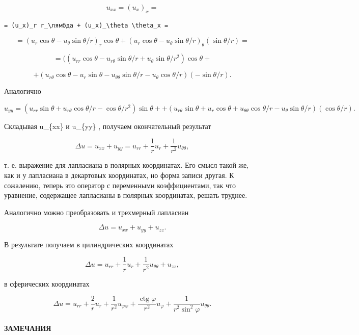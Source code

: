 \documentclass[
  ukrainian,
]{article}
\begin{document}
\[
u_{xx} = (u_x)_x =
\]

\begin{verbatim}
= (u_x)_r r_\лямбда + (u_x)_\theta \theta_x =
\end{verbatim}

\[
= (u_r \cos \theta - u_\theta \sin \theta/r)_r \cos \theta + (u_r \cos \theta - u_\theta \sin \theta/r)_\theta (\sin \theta/r) =
\]

\[
= ((u_{rr} \cos \theta - u_{r\theta} \sin \theta/r + u_\theta \sin \theta/r^2) \cos \theta +
\]

\[
+ (u_{r\theta} \cos \theta - u_r \sin \theta - u_{\theta\theta} \sin \theta/r - u_\theta \cos \theta/r) (-\sin \theta/r).
\]

Аналогично

\[
u_{yy} = (u_{rr}\sin\theta + u_{r\theta}\cos\theta/r - \cos\theta/r^2)\sin\theta + + (u_{r\theta}\sin\theta + u_{r}\cos\theta + u_{\theta\theta}\cos\theta/r - u_{\theta}\sin\theta/r)(\cos\theta/r).
\]

Складывая u\_\{xx\} и u\_\{yy\} , получаем окончательный результат

\[
\Delta u = u_{xx} + u_{yy} = u_{rr} + \frac{1}{r} u_r + \frac{1}{r^2} u_{\theta\theta},
\]

т. е. выражение для лапласиана в полярных координатах. Его смысл такой
же, как и у лапласиана в декартовых координатах, но форма записи другая.
К сожалению, теперь это оператор с переменными коэффициентами, так что
уравнение, содержащее лапласианы в полярных координатах, решать труднее.

Аналогично можно преобразовать и трехмерный лапласиан

\[
\Delta u = u_{xx} + u_{yy} + u_{zz}.
\]

В результате получаем в цилиндрических координатах

\[
\Delta u = u_{rr} + \frac{1}{r} u_r + \frac{1}{r^2} u_{\theta\theta} + u_{zz},
\]

в сферических координатах

\[
\Delta u = u_{rr} + \frac{2}{r} u_r + \frac{1}{r^2} u_{\varphi\varphi} + \frac{\operatorname{ctg} \varphi}{r^2} u_{\varphi} + \frac{1}{r^2 \sin^2 \varphi} u_{\theta\theta}.
\]

\paragraph{ЗАМЕЧАНИЯ}\label{ux437ux430ux43cux435ux447ux430ux43dux438ux44f-7}
\end{document}
